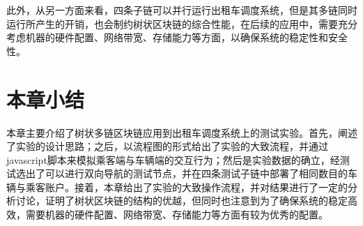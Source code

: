 此外，从另一方面来看，四条子链可以并行运行出租车调度系统，但是其多链同时运行所产生的开销，也会制约树状区块链的综合性能，在后续的应用中，需要充分考虑机器的硬件配置、网络带宽、存储能力等方面，以确保系统的稳定性和安全性。

\section{本章小结}

本章主要介绍了树状多链区块链应用到出租车调度系统上的测试实验。首先，阐述了实验的设计思路；之后，以流程图的形式给出了实验的大致流程，并通过javascript脚本来模拟乘客端与车辆端的交互行为；然后是实验数据的确立，经测试选出了可以进行双向导航的测试节点，并在四条测试子链中部署了相同数目的车辆与乘客账户。接着，本章给出了实验的大致操作流程，并对结果进行了一定的分析讨论，证明了树状区块链的结构的优越，但同时也注意到为了确保系统的稳定高效，需要机器的硬件配置、网络带宽、存储能力等方面有较为优秀的配置。


